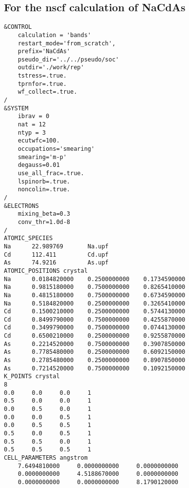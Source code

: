 \documentclass[3p,preprint]{elsarticle}
\begin{document}
\subsection{For the nscf calculation of NaCdAs}\label{app:NaCdAs-rep-in}
\begin{lstlisting}[basicstyle=\ttfamily\footnotesize]
&CONTROL
    calculation = 'bands'
    restart_mode='from_scratch',
    prefix='NaCdAs'
    pseudo_dir='../../pseudo/soc'
    outdir='./work/rep'
    tstress=.true.
    tprnfor=.true.
    wf_collect=.true.
/
&SYSTEM
    ibrav = 0
    nat = 12
    ntyp = 3
    ecutwfc=100.
    occupations='smearing'
    smearing='m-p'
    degauss=0.01
    use_all_frac=.true.
    lspinorb=.true.
    noncolin=.true.
/
&ELECTRONS
    mixing_beta=0.3
    conv_thr=1.0d-8
/
ATOMIC_SPECIES
Na      22.989769       Na.upf
Cd      112.411         Cd.upf
As      74.9216         As.upf
ATOMIC_POSITIONS crystal
Na      0.0184820000    0.2500000000    0.1734590000
Na      0.9815180000    0.7500000000    0.8265410000
Na      0.4815180000    0.7500000000    0.6734590000
Na      0.5184820000    0.2500000000    0.3265410000
Cd      0.1500210000    0.2500000000    0.5744130000
Cd      0.8499790000    0.7500000000    0.4255870000
Cd      0.3499790000    0.7500000000    0.0744130000
Cd      0.6500210000    0.2500000000    0.9255870000
As      0.2214520000    0.7500000000    0.3907850000
As      0.7785480000    0.2500000000    0.6092150000
As      0.2785480000    0.2500000000    0.8907850000
As      0.7214520000    0.7500000000    0.1092150000
K_POINTS crystal
8
0.0     0.0     0.0     1
0.5     0.0     0.0     1
0.0     0.5     0.0     1
0.0     0.0     0.5     1
0.0     0.5     0.5     1
0.5     0.0     0.5     1
0.5     0.5     0.0     1
0.5     0.5     0.5     1
CELL_PARAMETERS angstrom
    7.6494810000     0.0000000000     0.0000000000
    0.0000000000     4.5188670000     0.0000000000
    0.0000000000     0.0000000000     8.1790120000
\end{lstlisting}
\end{document}
